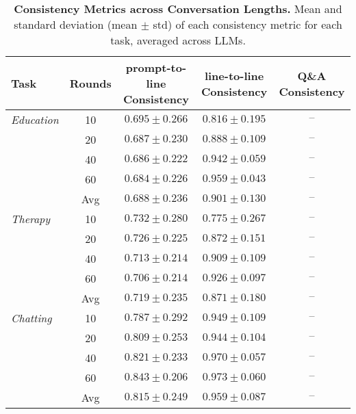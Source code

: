 
\begin{table*}[t]
    \centering
    \scriptsize
    \begin{tabular}{l c c c c}
        \toprule
        \textbf{Task} & \textbf{Rounds} 
        & \textbf{prompt-to-line Consistency} 
        & \textbf{line-to-line Consistency} 
        & \textbf{Q\&A Consistency} \\
        \midrule
\textit{Education} & 10 & $0.695 \pm 0.266$ & $0.816 \pm 0.195$ & $\text{--}$ \\
 & 20 & $0.687 \pm 0.230$ & $0.888 \pm 0.109$ & $\text{--}$ \\
 & 40 & $0.686 \pm 0.222$ & $0.942 \pm 0.059$ & $\text{--}$ \\
 & 60 & $0.684 \pm 0.226$ & $0.959 \pm 0.043$ & $\text{--}$ \\
 & Avg & $0.688 \pm 0.236$ & $0.901 \pm 0.130$ & $\text{--}$ \\
\textit{Therapy} & 10 & $0.732 \pm 0.280$ & $0.775 \pm 0.267$ & $\text{--}$ \\
 & 20 & $0.726 \pm 0.225$ & $0.872 \pm 0.151$ & $\text{--}$ \\
 & 40 & $0.713 \pm 0.214$ & $0.909 \pm 0.109$ & $\text{--}$ \\
 & 60 & $0.706 \pm 0.214$ & $0.926 \pm 0.097$ & $\text{--}$ \\
 & Avg & $0.719 \pm 0.235$ & $0.871 \pm 0.180$ & $\text{--}$ \\
\textit{Chatting} & 10 & $0.787 \pm 0.292$ & $0.949 \pm 0.109$ & $\text{--}$ \\
 & 20 & $0.809 \pm 0.253$ & $0.944 \pm 0.104$ & $\text{--}$ \\
 & 40 & $0.821 \pm 0.233$ & $0.970 \pm 0.057$ & $\text{--}$ \\
 & 60 & $0.843 \pm 0.206$ & $0.973 \pm 0.060$ & $\text{--}$ \\
 & Avg & $0.815 \pm 0.249$ & $0.959 \pm 0.087$ & $\text{--}$ \\
        \bottomrule
    \end{tabular}
    \caption{\textbf{Consistency Metrics across Conversation Lengths.} 
    Mean and standard deviation (mean $\pm$ std) of each consistency metric for each task, averaged across LLMs.}
    \label{tab:length_consistency}
\end{table*}
